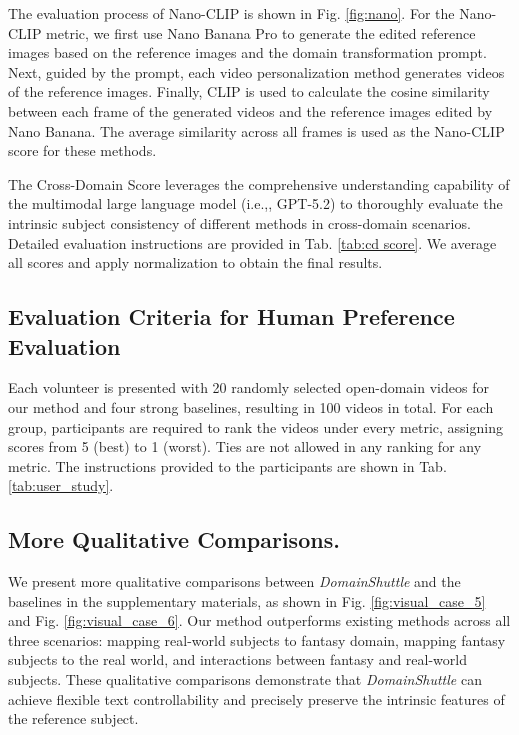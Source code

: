 \documentclass{llmxive}
\providecommand{\ie}{i.e.,\xspace}
\begin{document}
The evaluation process of Nano-CLIP is shown in Fig. \ref{fig:nano}. For the Nano-CLIP metric, we first use Nano Banana Pro \cite{nano_banana} to generate the edited reference images based on the reference images and the domain transformation prompt. Next, guided by the prompt, each video personalization method generates videos of the reference images. Finally, CLIP is used to calculate the cosine similarity between each frame of the generated videos and the reference images edited by Nano Banana. The average similarity across all frames is used as the Nano-CLIP score for these methods.

The Cross-Domain Score leverages the comprehensive understanding capability of the multimodal large language model (\ie, GPT-5.2) to thoroughly evaluate the intrinsic subject consistency of different methods in cross-domain scenarios. Detailed evaluation instructions are provided in Tab. \ref{tab:cd score}. We average all scores and apply normalization to obtain the final results.




\subsection{Evaluation Criteria for Human Preference Evaluation}



Each volunteer is presented with 20 randomly selected open-domain videos for our method and four strong baselines, resulting in 100 videos in total. For each group, participants are required to rank the videos under every metric, assigning scores from 5 (best) to 1 (worst). Ties are not allowed in any ranking for any metric. The instructions provided to the participants are shown in Tab. \ref{tab:user_study}.



\subsection{More Qualitative Comparisons.}

We present more qualitative comparisons between \textit{DomainShuttle} and the baselines in the supplementary materials, as shown in Fig. \ref{fig:visual_case_5} and  Fig. \ref{fig:visual_case_6}. Our method outperforms existing methods across all three scenarios: mapping real-world subjects to fantasy domain, mapping fantasy subjects to the real world, and interactions between fantasy and real-world subjects. These qualitative comparisons demonstrate that \textit{DomainShuttle}  can achieve flexible text controllability and precisely preserve the intrinsic features of the reference subject.
\end{document}
